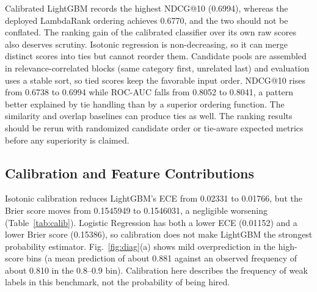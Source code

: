 \documentclass[conference]{IEEEtran}
\begin{document}
\begin{table}[!t]
\caption{Held-Out Weak-Label Benchmark Results (11,520 Pairs)}
\label{tab:main}
\centering
\footnotesize
\setlength{\tabcolsep}{2.2pt}
\end{table}

Calibrated LightGBM records the highest NDCG@10 (0.6994), whereas the deployed LambdaRank ordering achieves 0.6770, and the two should not be conflated. The ranking gain of the calibrated classifier over its own raw scores also deserves scrutiny. Isotonic regression is non-decreasing, so it can merge distinct scores into ties but cannot reorder them. Candidate pools are assembled in relevance-correlated blocks (same category first, unrelated last) and evaluation uses a stable sort, so tied scores keep the favorable input order. NDCG@10 rises from 0.6738 to 0.6994 while ROC-AUC falls from 0.8052 to 0.8041, a pattern better explained by tie handling than by a superior ordering function. The similarity and overlap baselines can produce ties as well. The ranking results should be rerun with randomized candidate order or tie-aware expected metrics before any superiority is claimed.

\subsection{Calibration and Feature Contributions}
Isotonic calibration reduces LightGBM's ECE from 0.02331 to 0.01766, but the Brier score moves from 0.1545949 to 0.1546031, a negligible worsening (Table~\ref{tab:calib}). Logistic Regression has both a lower ECE (0.01152) and a lower Brier score (0.15386), so calibration does not make LightGBM the strongest probability estimator. Fig.~\ref{fig:diag}(a) shows mild overprediction in the high-score bins (a mean prediction of about 0.881 against an observed frequency of about 0.810 in the 0.8--0.9 bin). Calibration here describes the frequency of weak labels in this benchmark, not the probability of being hired.
\end{document}
